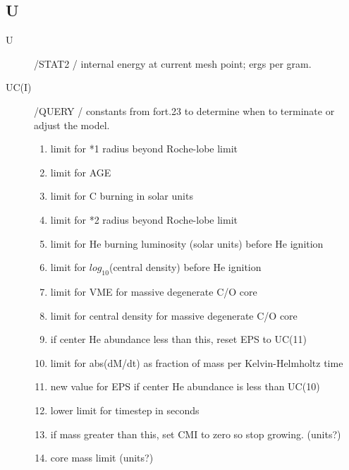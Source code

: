 \documentclass{article}
\begin{document}
\subsection*{U}
\begin{description}

	\item[U]		    /STAT2 / internal energy at current mesh point; ergs per gram.

	\item[UC(I)]		    /QUERY / constants from fort.23 to determine when to terminate or adjust the model.
		\begin{enumerate}
			\item 	limit for *1 radius beyond Roche-lobe limit
            		\item   limit for AGE
            		\item   limit for C burning in solar units
            		\item   limit for *2 radius beyond Roche-lobe limit
            		\item   limit for He burning luminosity (solar units) before He ignition
            		\item   limit for $log_{10}$(central density) before He ignition
            		\item   limit for VME for massive degenerate C/O core
            		\item   limit for central density for massive degenerate C/O core
            		\item   if center He abundance less than this, reset EPS to UC(11)
            		\item  limit for abs(dM/dt) as fraction of mass per Kelvin-Helmholtz time
            		\item  new value for EPS if center He abundance is less than UC(10)
            		\item  lower limit for timestep in seconds
            		\item  if mass greater than this, set CMI to zero so stop growing.  (units?)
            		\item  core mass limit  (units?)
	\end{enumerate}
\end{description}
\end{document}
